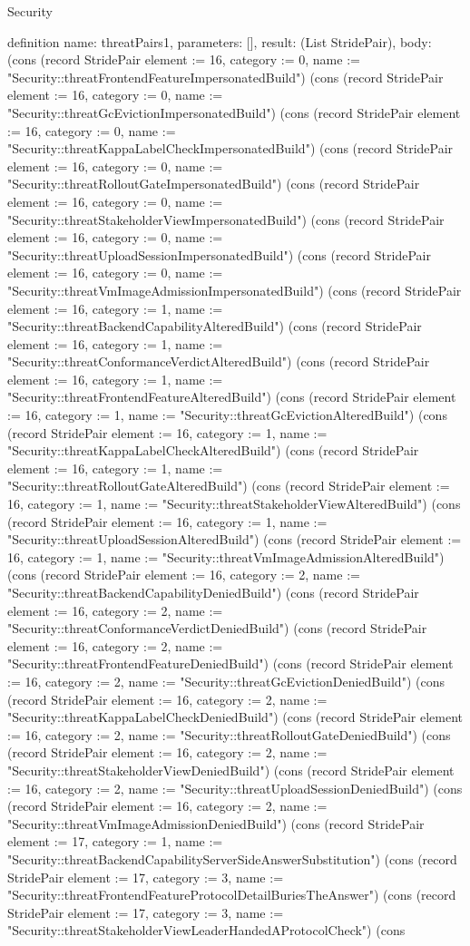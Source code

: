 \begin{lexlean}{Security}
\begin{semanticmodule}
definition{
  name: threatPairs1,
  parameters: [],
  result: (List StridePair),
  body: (cons (record StridePair {element := 16, category := 0, name := "Security::threatFrontendFeatureImpersonatedBuild"}) (cons (record StridePair {element := 16, category := 0, name := "Security::threatGcEvictionImpersonatedBuild"}) (cons (record StridePair {element := 16, category := 0, name := "Security::threatKappaLabelCheckImpersonatedBuild"}) (cons (record StridePair {element := 16, category := 0, name := "Security::threatRolloutGateImpersonatedBuild"}) (cons (record StridePair {element := 16, category := 0, name := "Security::threatStakeholderViewImpersonatedBuild"}) (cons (record StridePair {element := 16, category := 0, name := "Security::threatUploadSessionImpersonatedBuild"}) (cons (record StridePair {element := 16, category := 0, name := "Security::threatVmImageAdmissionImpersonatedBuild"}) (cons (record StridePair {element := 16, category := 1, name := "Security::threatBackendCapabilityAlteredBuild"}) (cons (record StridePair {element := 16, category := 1, name := "Security::threatConformanceVerdictAlteredBuild"}) (cons (record StridePair {element := 16, category := 1, name := "Security::threatFrontendFeatureAlteredBuild"}) (cons (record StridePair {element := 16, category := 1, name := "Security::threatGcEvictionAlteredBuild"}) (cons (record StridePair {element := 16, category := 1, name := "Security::threatKappaLabelCheckAlteredBuild"}) (cons (record StridePair {element := 16, category := 1, name := "Security::threatRolloutGateAlteredBuild"}) (cons (record StridePair {element := 16, category := 1, name := "Security::threatStakeholderViewAlteredBuild"}) (cons (record StridePair {element := 16, category := 1, name := "Security::threatUploadSessionAlteredBuild"}) (cons (record StridePair {element := 16, category := 1, name := "Security::threatVmImageAdmissionAlteredBuild"}) (cons (record StridePair {element := 16, category := 2, name := "Security::threatBackendCapabilityDeniedBuild"}) (cons (record StridePair {element := 16, category := 2, name := "Security::threatConformanceVerdictDeniedBuild"}) (cons (record StridePair {element := 16, category := 2, name := "Security::threatFrontendFeatureDeniedBuild"}) (cons (record StridePair {element := 16, category := 2, name := "Security::threatGcEvictionDeniedBuild"}) (cons (record StridePair {element := 16, category := 2, name := "Security::threatKappaLabelCheckDeniedBuild"}) (cons (record StridePair {element := 16, category := 2, name := "Security::threatRolloutGateDeniedBuild"}) (cons (record StridePair {element := 16, category := 2, name := "Security::threatStakeholderViewDeniedBuild"}) (cons (record StridePair {element := 16, category := 2, name := "Security::threatUploadSessionDeniedBuild"}) (cons (record StridePair {element := 16, category := 2, name := "Security::threatVmImageAdmissionDeniedBuild"}) (cons (record StridePair {element := 17, category := 1, name := "Security::threatBackendCapabilityServerSideAnswerSubstitution"}) (cons (record StridePair {element := 17, category := 3, name := "Security::threatFrontendFeatureProtocolDetailBuriesTheAnswer"}) (cons (record StridePair {element := 17, category := 3, name := "Security::threatStakeholderViewLeaderHandedAProtocolCheck"}) (cons }
\end{semanticmodule}
\end{lexlean}
